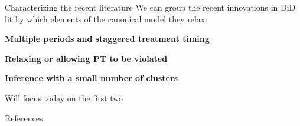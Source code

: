 \documentclass[aspectratio = 169, 12pt]{beamer}
\begin{document}
\begin{frame}{Characterizing the recent literature}
	We can group the recent innovations in DiD lit by which elements of the canonical model they relax:
	\medskip
	
	\begin{wideitemize}
		\item
		\textbf{Multiple periods and staggered treatment timing}
		
		\item
		\textbf{Relaxing or allowing PT to be violated}
		
		\item
		\textbf{Inference with a small number of clusters}
		
	\end{wideitemize}
	\medskip
	Will focus today on the first two
\end{frame}


\backupbegin
\begin{frame}{References}
  
\end{frame}
\backupend
\end{document}
